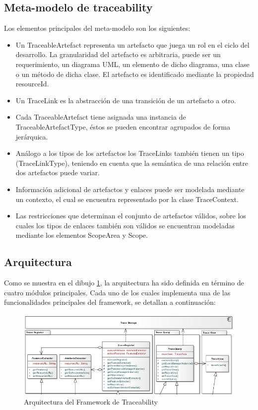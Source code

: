 \documentclass[a4paper,12pt,oneside]{book}
\begin{document}
\subsection{Meta-modelo de traceability}

Los elementos principales del meta-modelo son los siguientes:

\begin{itemize}
\item     Un TraceableArtefact representa un artefacto que juega un rol en el ciclo del desarrollo. La granularidad del artefacto es arbitraria, puede ser un requerimiento, un diagrama UML, un elemento de dicho diagrama, una clase o un método de dicha clase. El artefacto es identificado mediante la propiedad resourceId.
\item    Un TraceLink es la abstracción de una transición de un artefacto a otro.
\item    Cada TraceableArtefact tiene asignada una instancia de TraceableArtefactType, éstos se pueden encontrar agrupados de forma jerárquica.
 \item   Análogo a los tipos de los artefactos los TraceLinks también tienen un tipo (TraceLinkType), teniendo en cuenta que la semántica de una relación entre dos artefactos puede variar.
\item    Información adicional de artefactos y enlaces puede ser modelada mediante un contexto, el cual se encuentra representado por la clase TraceContext.
\item    Las restricciones que determinan el conjunto de artefactos válidos, sobre los cuales los tipos de enlaces también son válidos se encuentran modeladas mediante los elementos ScopeArea y Scope.
\end{itemize}

\subsection{Arquitectura}

Como se muestra en el dibujo \ref{fig:SPLArquitectura}, la arquitectura ha sido definida en término de cuatro módulos principales. Cada uno de los cuales implementa una de las funcionalidades principales del framework, se detallan a continuación:

\begin{figure}[hbtp]
\centering
\includegraphics[scale=.55]{./img/ArquitecturaTraceabilityFramework}
\caption{Arquitectura del Framework de Traceability}
\label{fig:SPLArquitectura}
\end{figure}
\end{document}
